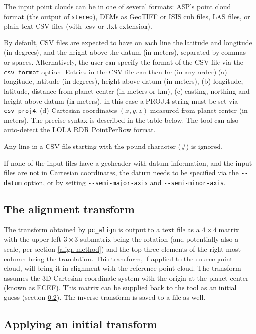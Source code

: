 The input point clouds can be in one of several formats: ASP's point
cloud format (the output of \texttt{stereo}), DEMs as GeoTIFF or ISIS
cub files, LAS files, or plain-text CSV files (with .csv or .txt
extension).

By default, CSV files are expected to have on each line the latitude and
longitude (in degrees), and the height above the datum (in meters),
separated by commas or spaces. Alternatively, the user can specify the
format of the CSV file via the \texttt{-\/-csv-format} option. Entries
in the CSV file can then be (in any order) (a) longitude, latitude (in
degrees), height above datum (in meters), (b) longitude, latitude,
distance from planet center (in meters or km), (c) easting, northing and
height above datum (in meters), in this case a PROJ.4 string must be set
via \texttt{-\/-csv-proj4}, (d) Cartesian coordinates $(x, y, z)$
measured from planet center (in meters). The precise syntax is described
in the table below. The tool can also auto-detect the LOLA RDR
PointPerRow format.

Any line in a CSV file starting with the pound character (\#) is ignored.

If none of the input files have a geoheader with datum information, and
the input files are not in Cartesian coordinates, the datum needs to be
specified via the \texttt{-\/-datum} option, or by setting
\texttt{-\/-semi-major-axis} and \texttt{-\/-semi-minor-axis}.

\subsection{The alignment transform}
\label{alignmenttransform}

The transform obtained by \texttt{pc\_align} is output to a text file as
a $4\times 4$ matrix with the upper-left $3\times 3$ submatrix being the
rotation (and potentially also a scale, per section \ref{align-method})
and the top three elements of the right-most column being the
translation. This transform, if applied to the source point cloud, will
bring it in alignment with the reference point cloud. The transform
assumes the 3D Cartesian coordinate system with the origin at the planet
center (known as ECEF). This matrix can be supplied back to the tool as
an initial guess (section \ref{prevtrans}). The inverse transform is
saved to a file as well.

\subsection{Applying an initial transform}
\label{prevtrans}

